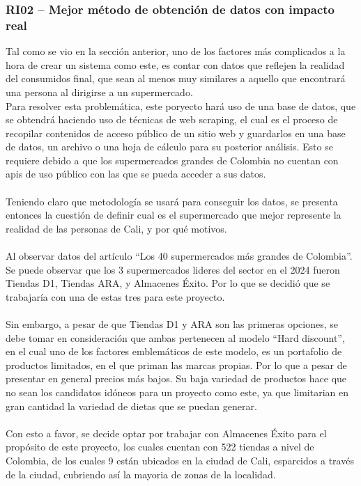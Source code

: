 \subsubsection{RI02 -- Mejor m\'etodo de obtenci\'on de datos con impacto real}
\noindent Tal como se vio en la secci\'on anterior, uno de los factores m\'as complicados a la hora de crear un sistema como este, es contar con datos que reflejen la realidad del consumidos final, que sean al menos muy similares a aquello que encontrar\'a una persona al dirigirse a un supermercado.
\\
Para resolver esta problem\'atica, este poryecto har\'a uso de una base de datos, que se obtendr\'a haciendo uso de t\'ecnicas de web  scraping, el cual es el proceso de recopilar contenidos de acceso público de un sitio web y guardarlos en una base de datos, un archivo o una hoja de cálculo para su posterior an\'alisis\cite{WebScrapingMeaning2024}. Esto se requiere debido a que los supermercados grandes de Colombia no cuentan con apis de uso p\'ublico con las que se pueda acceder a sus datos.
\\
\\
Teniendo claro que metodolog\'ia se usar\'a para conseguir los datos, se presenta entonces la cuesti\'on de definir cual es el supermercado que mejor represente la realidad de las personas de Cali, y por qu\'e motivos.
\\
\\
Al observar datos del art\'iculo ``Los 40 supermercados m\'as grandes de Colombia''\cite{palacios40SupermercadosMas2024}. Se puede observar que los 3 supermercados lideres del sector en el 2024 fueron Tiendas D1, Tiendas ARA, y Almacenes \'Exito. Por lo que se decidi\'o que se trabajar\'ia con una de estas tres para este proyecto.
\\
\\
Sin embargo, a pesar de que Tiendas D1 y ARA son las primeras opciones, se debe tomar en consideraci\'on que ambas pertenecen al modelo ``Hard discount''\cite{userHardDiscountMas}, en el cual uno de los factores emblem\'aticos de este modelo, es un portafolio de productos limitados, en el que priman las marcas propias. Por lo que a pesar de presentar en general precios m\'as bajos. Su baja variedad de productos hace que no sean los candidatos id\'oneos para un proyecto como este, ya que limitarian en gran cantidad la variedad de dietas que se puedan generar.
\\
\\
Con esto a favor, se decide optar por trabajar con Almacenes \'Exito para el prop\'osito de este proyecto, los cuales cuentan con 522 tiendas a nivel de Colombia\cite{QuienesSomosGrupo}, de los cuales 9 est\'an ubicados en la ciudad de Cali, esparcidos a trav\'es de la ciudad, cubriendo as\'i la mayoria de zonas de la localidad.



